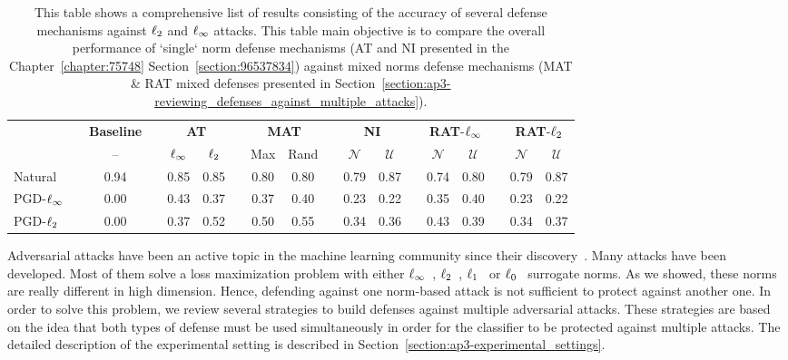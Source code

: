 \begin{table}[htbp]
  \centering
  \begin{tabular}{lccccccccccccccccc}
    \toprule
      &   & \textbf{Baseline} & \phantom{...}  & \multicolumn{2}{c}{\textbf{AT}} & \phantom{...}  & \multicolumn{2}{c}{\textbf{MAT}} &  \phantom{...} & \multicolumn{2}{c}{\textbf{NI}} &  \phantom{...} & \multicolumn{2}{c}{\textbf{RAT}-$\ell_\infty $} &  \phantom{...} & \multicolumn{2}{c}{\textbf{RAT}-$\ell_2 $} \\
  \cmidrule{3-3}\cmidrule{5-6}\cmidrule{8-9}\cmidrule{11-12}\cmidrule{14-15}\cmidrule{17-18}      &   & -- &   & $\ell_\infty $ & $\ell_2 $ &   & Max & Rand &   & $\mathcal{N}$ & $\mathcal{U}$ &   & $\mathcal{N}$ & $\mathcal{U}$ &   & $\mathcal{N}$ & $\mathcal{U}$ \\
    \midrule
    Natural &   & 0.94 &   & 0.85 & 0.85 &   & 0.80 & 0.80 &   & 0.79 & 0.87 &   & 0.74 & 0.80 &   & 0.79 & 0.87 \\
    PGD-$\ell_\infty $ &   & 0.00 &   & 0.43 & 0.37 &   & 0.37 & 0.40 &   & 0.23 & 0.22 &   & 0.35 & 0.40 &   & 0.23 & 0.22 \\
    PGD-$\ell_2 $ &   & 0.00 &   & 0.37 & 0.52 &   & 0.50 & 0.55 &   & 0.34 & 0.36 &   & 0.43 & 0.39 &   & 0.34 & 0.37 \\
    \bottomrule
  \end{tabular}%
  \caption{This table shows a comprehensive list of results consisting of the accuracy of several defense mechanisms against $\ell_2 $ and $\ell_\infty $ attacks. This table main objective is to compare the overall performance of ‘single‘ norm defense mechanisms (AT and NI presented in the Chapter~\ref{chapter:75748} Section~\ref{section:96537834}) against mixed norms defense mechanisms (MAT \& RAT mixed defenses presented in Section~\ref{section:ap3-reviewing_defenses_against_multiple_attacks}).}
  \label{table:ap3-results}
\end{table}%

Adversarial attacks have been an active topic in the machine learning community since their discovery~\cite{globerson2006nightmare, biggio2013evasion,Szegedy2013IntriguingPO}.
Many attacks have been developed.
Most of them solve a loss maximization problem with either $\ell_\infty $~\cite{goodfellow2014explaining,kurakin2016adversarial,madry2018towards}, $\ell_2 $~\cite{carlini2017towards,kurakin2016adversarial,madry2018towards}, $\ell_1 $~\cite{tramer2019adversarial} or $\ell_0 $~\cite{papernot2016limitations} surrogate norms.
As we showed, these norms are really different in high dimension.
Hence, defending against one norm-based attack is not sufficient to protect against another one. 
In order to solve this problem, we review several strategies to build defenses against multiple adversarial attacks.
These strategies are based on the idea that both types of defense must be used simultaneously in order for the classifier to be protected against multiple attacks.
The detailed description of the experimental setting is described in Section~\ref{section:ap3-experimental_settings}.

